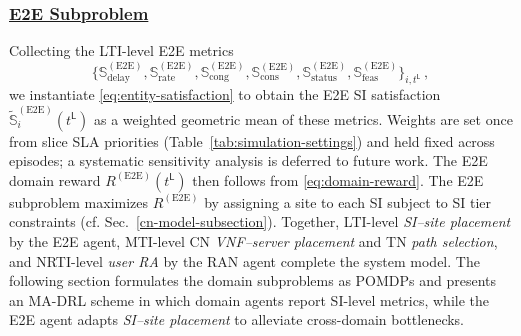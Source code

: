 \documentclass[12pt,lettersize,journal,onecolumn]{IEEEtran}
\begin{document}
\subsubsection{\underline{E2E Subproblem}}\label{e2e-problem-formulation}
Collecting the LTI-level E2E metrics
$$\bigl\{\mathbb{S}^{\mathrm{(E2E)}}_{\mathrm{delay}},
\mathbb{S}^{\mathrm{(E2E)}}_{\mathrm{rate}},
\mathbb{S}^{\mathrm{(E2E)}}_{\mathrm{cong}},
\mathbb{S}^{\mathrm{(E2E)}}_{\mathrm{cons}},
\mathbb{S}^{\mathrm{(E2E)}}_{\mathrm{status}},
\mathbb{S}^{\mathrm{(E2E)}}_{\mathrm{feas}}\bigr\}_{i,t^\mathsf{L}} \, ,$$
we instantiate \eqref{eq:entity-satisfaction} to obtain the E2E SI satisfaction
$\tilde{\mathbb{S}}^{\mathrm{(E2E)}}_{i}(t^\mathsf{L})$
as a weighted geometric mean of these metrics. Weights are set once from slice SLA priorities (Table~\ref{tab:simulation-settings}) and held fixed across episodes; a systematic sensitivity analysis is deferred to future work.  
The E2E domain reward $R^{\mathrm{(E2E)}}(t^\mathsf{L})$ then follows from \eqref{eq:domain-reward}. %
The E2E subproblem maximizes $R^{\mathrm{(E2E)}}$ by assigning a site to each SI subject to SI tier constraints (cf. Sec.~\ref{cn-model-subsection}). Together, LTI-level \textit{SI–site placement} by the E2E agent, MTI-level CN \textit{VNF–server placement} and TN \textit{path selection}, and NRTI-level \textit{user RA} by the RAN agent complete the system model. The following section formulates the domain subproblems as POMDPs and presents an MA-DRL scheme in which domain agents report SI-level metrics, while the E2E agent adapts \textit{SI–site placement} to alleviate cross-domain bottlenecks.
\end{document}
